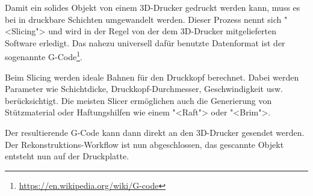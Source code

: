 \label{photogrammetry:slicing}

Damit ein solides Objekt von einem 3D-Drucker gedruckt werden kann, muss es bei
in druckbare Schichten umgewandelt werden. Dieser Prozess nennt sich "<Slicing">
und wird in der Regel von der dem 3D-Drucker mitgelieferten Software erledigt.
%
%
Das nahezu universell dafür benutzte Datenformat ist der sogenannte
G-Code\footnote{\url{https://en.wikipedia.org/wiki/G-code}}.

Beim Slicing werden ideale Bahnen für den Druckkopf berechnet. Dabei werden
Parameter wie Schichtdicke, Druckkopf-Durchmesser, Geschwindigkeit usw.
berücksichtigt. Die meisten Slicer ermöglichen auch die Generierung von
Stützmaterial oder Haftungshilfen wie einem "<Raft"> oder "<Brim">.

Der resultierende G-Code kann dann direkt an den 3D-Drucker gesendet werden. Der
Rekonstruktions-Workflow ist nun abgeschlossen, das gescannte Objekt entsteht
nun auf der Druckplatte.
